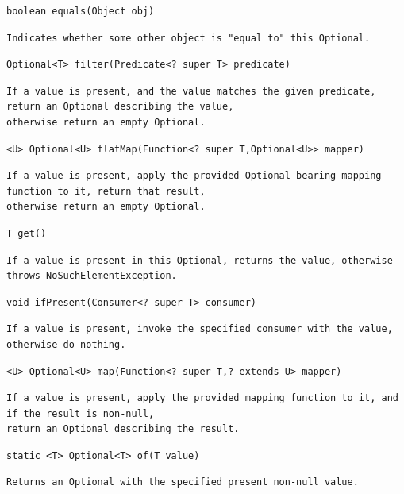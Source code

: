 \documentclass[5pt, portrait]{article}
\begin{document}
\begin{verbatim}
boolean equals(Object obj)
\end{verbatim}
\begin{verbatim}
Indicates whether some other object is "equal to" this Optional.
\end{verbatim}

\begin{verbatim}
Optional<T> filter(Predicate<? super T> predicate)
\end{verbatim}
\begin{verbatim}
If a value is present, and the value matches the given predicate, return an Optional describing the value,
otherwise return an empty Optional.
\end{verbatim}

\begin{verbatim}
<U> Optional<U> flatMap(Function<? super T,Optional<U>> mapper)
\end{verbatim}
\begin{verbatim}
If a value is present, apply the provided Optional-bearing mapping function to it, return that result,
otherwise return an empty Optional.
\end{verbatim}

\begin{verbatim}
T get()
\end{verbatim}
\begin{verbatim}
If a value is present in this Optional, returns the value, otherwise throws NoSuchElementException.
\end{verbatim}  

\begin{verbatim}
void ifPresent(Consumer<? super T> consumer)
\end{verbatim}
\begin{verbatim}
If a value is present, invoke the specified consumer with the value, otherwise do nothing.
\end{verbatim}  

\begin{verbatim}
<U> Optional<U> map(Function<? super T,? extends U> mapper)
\end{verbatim}
\begin{verbatim}
If a value is present, apply the provided mapping function to it, and if the result is non-null,
return an Optional describing the result.
\end{verbatim}  

\begin{verbatim}
static <T> Optional<T> of(T value)
\end{verbatim}
\begin{verbatim}
Returns an Optional with the specified present non-null value.
\end{verbatim}  
\end{document}
